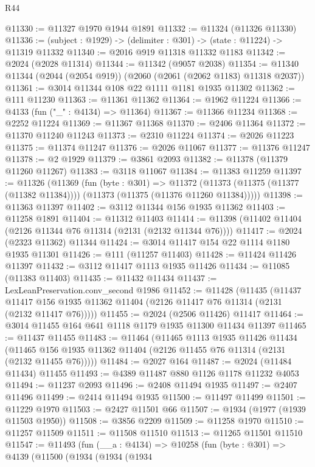 \begin{lexlean}{R44}
\begin{coremodule}
@11330 := @11327 @1970 @1944 @1891
@11332 := @11324 (@11326 @11330)
@11336 := (subject : @1929) -> (delimiter : @301) -> (state : @11224) -> @11319 @11332
@11340 := @2016 @919 @11318 @11332 @1183
@11342 := @2024 (@2028 @11314)
@11344 := @11342 (@9057 @2038)
@11354 := @11340 @11344 (@2044 (@2054 @919)) (@2060 (@2061 (@2062 @1183) @11318 @2037))
@11361 := @3014 @11344 @108 @22 @1111 @1181 @1935 @11302
@11362 := @111 @11230
@11363 := @11361 @11362
@11364 := @1962 @11224
@11366 := @4133 (fun ("_" : @4134) => @11364)
@11367 := @11366 @11234
@11368 := @2252 @11224
@11369 := @11367 @11368
@11370 := @2406 @11364
@11372 := @11370 @11240 @11243
@11373 := @2310 @11224
@11374 := @2026 @11223
@11375 := @11374 @11247
@11376 := @2026 @11067
@11377 := @11376 @11247
@11378 := @2 @1929
@11379 := @3861 @2093
@11382 := @11378 (@11379 @11260 @11267)
@11383 := @3118 @11067
@11384 := @11383 @11259
@11397 := @11326
    (@11369
      (fun (byte : @301) =>
      @11372 (@11373 (@11375 (@11377 (@11382 @11384)))) (@11373 (@11375 (@11376 @11260 @11384)))))
@11398 := @11363 @11397
@11402 := @3112 @11344 @156 @1935 @11362
@11403 := @11258 @1891
@11404 := @11312 @11403
@11414 := @11398 (@11402 @11404 (@2126 @11344 @76 @11314 (@2131 (@2132 @11344 @76))))
@11417 := @2024 (@2323 @11362) @11344
@11424 := @3014 @11417 @154 @22 @1114 @1180 @1935 @11301
@11426 := @111 (@11257 @11403)
@11428 := @11424 @11426 @11397
@11432 := @3112 @11417 @1113 @1935 @11426
@11434 := @11085 (@11383 @11403)
@11435 := @11432 @11434
@11437 := LexLeanPreservation.conv_second @1986
@11452 := @11428
    (@11435
      (@11437 @11417 @156 @1935 @11362 @11404 (@2126 @11417 @76 @11314 (@2131 (@2132 @11417 @76)))))
@11455 := @2024 (@2506 @11426) @11417
@11464 := @3014 @11455 @164 @641 @1118 @1179 @1935 @11300 @11434 @11397
@11465 := @11437 @11455
@11483 := @11464
    (@11465
      @1113
      @1935
      @11426
      @11434
      (@11465 @156 @1935 @11362 @11404 (@2126 @11455 @76 @11314 (@2131 (@2132 @11455 @76)))))
@11484 := @2027 @164
@11487 := @2024 (@11484 @11434) @11455
@11493 := @4389 @11487 @880 @1126 @1178 @11232 @4053
@11494 := @11237 @2093
@11496 := @2408 @11494 @1935
@11497 := @2407 @11496
@11499 := @2414 @11494 @1935
@11500 := @11497 @11499
@11501 := @11229 @1970
@11503 := @2427 @11501 @66
@11507 := @1934 (@1977 (@1939 @11503 @1950))
@11508 := @3856 @2209
@11509 := @11258 @1970
@11510 := @11257 @11509
@11511 := @11508 @11510
@11513 := @11265 @11501 @11510
@11547 := @11493
    (fun (__a : @4134) =>
    @10258
      (fun (byte : @301) =>
      @4139
        (@11500
          (@1934
            (@1934
              (@1934

\end{coremodule}
\end{lexlean}
